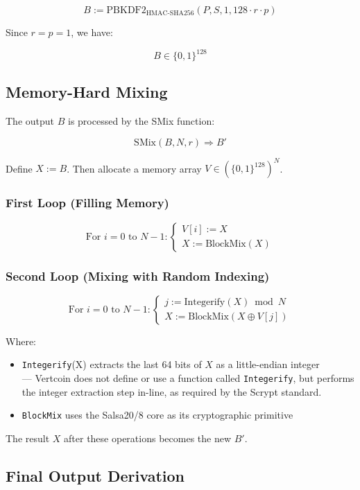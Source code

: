 \documentclass[12pt]{article}
\begin{document}
\[
B := \text{PBKDF2}_{\text{HMAC-SHA256}}(P, S, 1, 128 \cdot r \cdot p)
\]

Since \( r = p = 1 \), we have:

\[
B \in \{0,1\}^{128}
\]

\subsection{Memory-Hard Mixing}

The output \( B \) is processed by the SMix function:

\[
\text{SMix}(B, N, r) \Rightarrow B'
\]

Define \( X := B \). Then allocate a memory array \( V \in (\{0,1\}^{128})^N \).

\subsubsection{First Loop (Filling Memory)}

\[
\text{For } i = 0 \text{ to } N-1:
\begin{cases}
V[i] := X \\
X := \text{BlockMix}(X)
\end{cases}
\]

\subsubsection{Second Loop (Mixing with Random Indexing)}

\[
\text{For } i = 0 \text{ to } N-1:
\begin{cases}
j := \text{Integerify}(X) \bmod N \\
X := \text{BlockMix}(X \oplus V[j])
\end{cases}
\]

Where:
\begin{itemize}
    \item \texttt{Integerify}(X) extracts the last 64 bits of \( X \) as a little-endian integer \\
    --- Vertcoin does not define or use a function called \texttt{Integerify}, but performs the integer extraction step in-line, as required by the Scrypt standard.
    \item \texttt{BlockMix} uses the Salsa20/8 core as its cryptographic primitive
\end{itemize}

The result \( X \) after these operations becomes the new \( B' \).

\subsection{Final Output Derivation}
\end{document}

